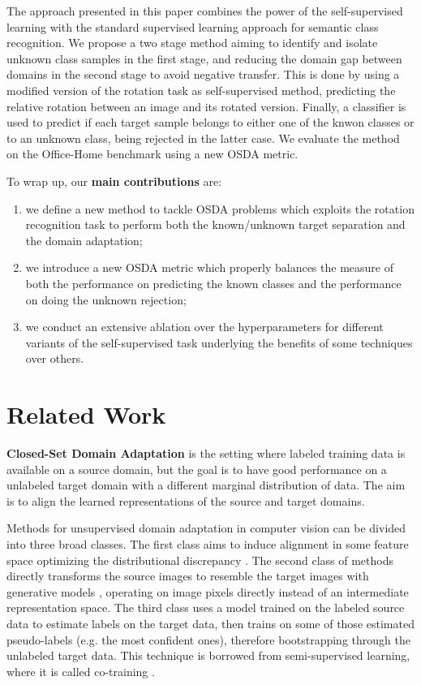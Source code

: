 \documentclass[10pt,twocolumn,letterpaper]{article}
\begin{document}
The approach presented in this paper combines the power of the self-supervised learning with the standard supervised learning approach for semantic class recognition.
We propose a two stage method aiming to identify and isolate unknown class samples in the first stage, 
and reducing the domain gap between domains in the second stage to avoid negative transfer.
This is done by using a modified version of the rotation task as self-supervised method,
predicting the relative rotation between an image and its rotated version.
Finally, a classifier is used to predict if each target sample belongs to either one of the knwon classes or to an unknown class, 
being rejected in the latter case.
We evaluate the method on the Office-Home benchmark \cite{OfficeHomeDataset} using a new OSDA metric. 

To wrap up, our \textbf{main contributions} are: 
\begin{enumerate}
  \item we define a new method to tackle OSDA problems which exploits the rotation recognition task to perform both the known/unknown target separation
and the domain adaptation;
  \item we introduce a new OSDA metric which properly balances the measure of both the performance on predicting the known classes and the performance on doing the unknown rejection;
  \item we conduct an extensive ablation over the hyperparameters for different variants of the self-supervised task underlying the benefits of some techniques over others.
\end{enumerate}

\section{Related Work}
\label{sec:relatedwork}
\textbf{Closed-Set Domain Adaptation} is the setting where labeled training data is 
available on a source domain, but the goal is to have good performance on a 
unlabeled target domain with a different marginal distribution
of data. The aim is to align the learned representations of the source and target domains.

Methods for unsupervised domain adaptation in computer vision can be divided into 
three broad classes. The first class aims to induce alignment in some feature space optimizing the distributional discrepancy \cite{bousmalis2016domain,long2015learning,ganin2015unsupervised,hoffman2017cycada}.
The second class of methods directly transforms the source images to resemble 
the target images with generative models \cite{taigman2016unsupervised,tzeng2017adversarial,bousmalis2017unsupervised}, 
operating on image pixels directly instead of an intermediate 
representation space.
The third class uses a model trained on the labeled source data to 
estimate labels on the target data, then trains on some of those estimated 
pseudo-labels (e.g. the most confident ones), therefore bootstrapping through the 
unlabeled target data. This technique is borrowed from semi-supervised learning, 
where it is called co-training \cite{saito2017asymmetric,zou2018domain,chen2017rethinking}.
\end{document}
